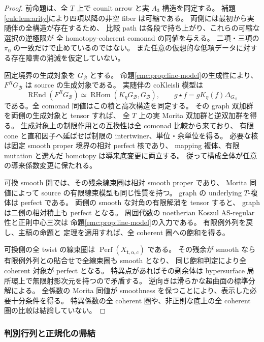 \begin{proof}
前命題は、全 $T$ 上で counit arrow と実 $A_3$ 構造を同定する。
補題\ref{euk:lem:arity}により四項以降の非空 fiber は可縮である。
両側には最初から実随伴の全構造が存在するため、
比較 path は各段で持ち上がり、これらの可縮な選択の逆極限が
全 homotopy-coherent comonad の同値を与える。
二項・三項の $\pi_0$ の一致だけで止めているのではない。
また任意の仮想的な低項データに対する存在障害の消滅を仮定していない。

固定境界の生成対象を $G_{\mathcal B}$ とする。
命題\ref{emc:prop:line-model}の生成性により、$F^RG_{\mathcal B}$ は source の生成対象である。
実随伴の coKleisli 模型は
\[
 \operatorname{REnd}(F^RG_{\mathcal B})
   \simeq\operatorname{RHom}(K_\eta G_{\mathcal B},G_{\mathcal B}),
 \qquad g\star f=gK_\eta(f)\Delta_{G_{\mathcal B}}
\]
である。全 comonad 同値はこの積と高次構造を同定する。
その graph 双加群を両側の生成対象と tensor すれば、
全 $T$ 上の実 Morita 双加群と逆双加群を得る。
生成対象上の制限作用との互換性は全 comonad 比較から来ており、
有限 cone と直和因子へ延ばせば制限の intertwiner、単位・余単位を得る。
必要な核は固定 smooth proper 境界の相対 perfect 核であり、
mapping 複体、有限 mutation と選んだ homotopy は導来底変更に両立する。
従って構成全体が任意の導来係数変更に保たれる。

可換 smooth 開では、その残余線束圏は相対 smooth proper であり、
Morita 同値によって source の有限線束模型も同じ性質を持つ。
graph の underlying $T$-複体は perfect である。
両側の smooth な対角の有限解消を tensor すると、
graph は二側の相対積上も perfect となる。
周囲代数の noetherian Koszul AS-regular 性と正則中心三次は
命題\ref{emc:prop:line-model}の入力である。
有限例外列を戻し、主稿の命題と
定理を適用すれば、全 coherent 圏への飽和を得る。

可換側の全 twist の線束圏は $\operatorname{Perf}(X_{\mathbf t,\alpha,c})$ である。
その残余が smooth なら有限例外列との貼合せで全線束圏も smooth となり、
同じ飽和判定により全 coherent 対象が perfect となる。
特異点があればその剰余体は hypersurface 局所環上で無限射影次元を持つので矛盾する。
逆向きは滑らかな超曲面の標準分解による。
全係数の Morita 同値が smoothness を保つことにより、表示した必要十分条件を得る。
特異係数の全 coherent 圏や、非正則な底上の全 coherent 圏の比較は結論していない。
\end{proof}

\subsubsection{判別行列と正規化の帰結}

